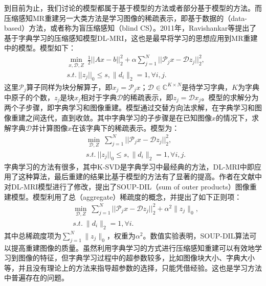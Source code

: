 到目前为止，我们讨论的模型都属于基于模型的方法或者部分基于模型的方法。而压缩感知MR重建另一大类方法是学习图像的稀疏表示，即基于数据的（data-based）方法，或者称为盲压缩感知\cite{gleichman2011blind}（blind CS）。2011年，Ravishankar等提出了基于字典学习的压缩感知模型DL-MRI\cite{dlmri}，这也是最早将学习的思想应用到MR重建中的模型。模型如下：
\begin{equation}
\begin{aligned}
	& \min_{x,\mathcal{D},Z}\ \frac{1}{2}||Ax-b||_2^2+\alpha\sum_{j=1}^N||\mathcal{P}_{j}x-\mathcal{D}z_j||_2^2,\\
	&s.t.\ ||z_j||_0\leq s, \|d_i\|_2=1, \forall i,j.
\end{aligned}
\end{equation}
这里$\mathcal{P}_j$算子同样为块分解算子，即$x_j=\mathcal{P}_jx$；$\mathcal{D}\in \mathbb{C}^{K\times N}$是待学习字典，$K$为字典中原子的个数，$z_j$是块$x_j$相对于字典$\mathcal{D}$的稀疏表示，即$z_j=\mathcal{D}x_j$。模型的求解分为两个子步骤，即字典学习和图像重建。模型通过交替方向法求解，在字典学习和图像重建之间迭代，直到收敛。其中字典学习的子步骤是在已知图像$x$的情况下，求解字典$\mathcal{D}$并计算图像$x$在该字典下的稀疏表示。模型为：
\begin{equation}
\begin{aligned}
	& \min_{\mathcal{D},Z}\ \sum_{j=1}^N||\mathcal{P}_{j}x-\mathcal{D}z_j||_2^2,\\
	&s.t.\ ||z_j||_0\leq s, \|d_i\|_2=1, \forall i,j.
\end{aligned}
\label{equ:dictlearning}
\end{equation}
字典学习的方法有很多\cite{ksvd,mairal2010online,rubinstein2009double}，其中K-SVD\cite{ksvd}是字典学习中最经典的方法，DL-MRI中即应用了这种算法，最后重建的结果比基于模型的方法有了显著的提高。作者在文献\cite{ravishankar2017efficient}中对DL-MRI模型进行了修改，提出了SOUP-DIL（sum of outer products）图像重建模型。模型利用了总（aggregate）稀疏度的概念，并提出了如下正则项：
\begin{equation}
\begin{aligned}
	& \min_{\mathcal{D},Z}\ \sum_{j=1}^N||\mathcal{P}_{j}x-\mathcal{D}z_j||_2^2 + \alpha^2\|z_j\|_0,\\
	&s.t.\ \|d_i\|_2=1, \forall i.
\end{aligned}
\label{equ:soup}
\end{equation}
其中总稀疏度项为$\sum_{j=1}^N\|z_j\|_0$，权重为$\alpha^2$。数值实验表明，SOUP-DIL算法可以提高重建图像的质量。虽然利用字典学习的方式进行压缩感知重建可以有效地学习到图像的特征，但字典学习过程中的超参数较多，比如图像块大小、字典大小等，并且没有理论上的方法来指导超参数的选择，只能凭借经验。这也是学习方法中普遍存在的问题。

